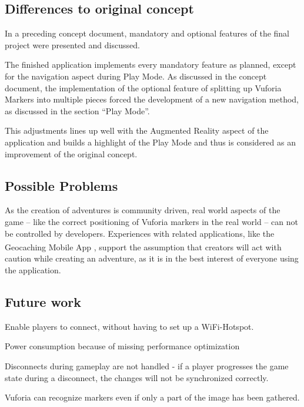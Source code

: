 \documentclass{sigchi-ext}
\begin{document}
\subsection{Differences to original concept}

In a preceding concept document, mandatory and optional features of the final project were presented and discussed.

The finished application implements every mandatory feature as planned, except for the navigation aspect during Play Mode. As discussed in the concept document, the implementation of the optional feature of splitting up Vuforia Markers into multiple pieces forced the development of a new navigation method, as discussed in the section ``Play Mode''. 

This adjustments lines up well with the Augmented Reality aspect of the application and builds a highlight of the Play Mode and thus is considered as an improvement of the original concept.

\subsection{Possible Problems}

As the creation of adventures is community driven, real world aspects of the game -- like the correct positioning of Vuforia markers in the real world -- can not be controlled by developers. Experiences with related applications, like the Geocaching\textsuperscript{\textregistered} Mobile App \cite{app:geocaching}, support the assumption that creators will act with caution while creating an adventure, as it is in the best interest of everyone using the application.

\subsection{Future work}

Enable players to connect, without having to set up a WiFi-Hotspot.

Power consumption because of missing performance optimization

Disconnects during gameplay are not handled - if a player progresses the game state during a disconnect, the changes will not be synchronized correctly.

Vuforia can recognize markers even if only a part of the image has been gathered.

\balance{} 



\end{document}
